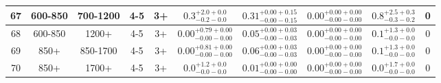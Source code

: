 \documentclass[11pt, oneside]{article}
\begin{document}
\begin{table}
{\begin{tabular}{ |c|c|c|c|c||c|c|c||c|c| }
67 & 600-850 & 700-1200 & 4-5 & 3+ & $0.3^{+2.0+0.0}_{-0.2-0.0}$ & $0.31^{+0.00+0.15}_{-0.00-0.15}$ & $0.00^{+0.00+0.00}_{-0.00-0.00}$ & $0.8^{+2.5+0.3}_{-0.3-0.2}$ & 0 \\ \hline
68 & 600-850 & 1200+ & 4-5 & 3+ & $0.00^{+0.79+0.00}_{-0.00-0.00}$ & $0.05^{+0.00+0.03}_{-0.00-0.03}$ & $0.00^{+0.00+0.00}_{-0.00-0.00}$ & $0.1^{+1.3+0.0}_{-0.0-0.0}$ & 0 \\ \hline
69 & 850+ & 850-1700 & 4-5 & 3+ & $0.00^{+0.81+0.00}_{-0.00-0.00}$ & $0.06^{+0.00+0.03}_{-0.00-0.03}$ & $0.00^{+0.00+0.00}_{-0.00-0.00}$ & $0.1^{+1.3+0.0}_{-0.0-0.0}$ & 0 \\ \hline
70 & 850+ & 1700+ & 4-5 & 3+ & $0.0^{+1.2+0.0}_{-0.0-0.0}$ & $0.01^{+0.00+0.00}_{-0.00-0.00}$ & $0.00^{+0.00+0.00}_{-0.00-0.00}$ & $0.0^{+1.7+0.0}_{-0.0-0.0}$ & 0 \\ \hline
\end{tabular}}
\end{table}
\end{document}
